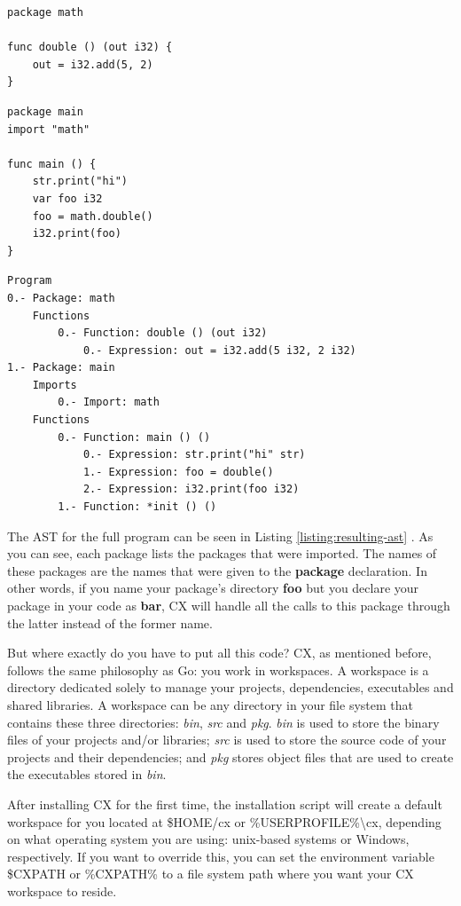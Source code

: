 \documentclass[11pt,fleqn,openany]{book} %
\begin{document}
\begin{lstlisting}[caption={Package to be Imported},captionpos=b,label={listing:import-example}]
package math

func double () (out i32) {
	out = i32.add(5, 2)
}
\end{lstlisting}

\begin{lstlisting}[caption={Main Package},captionpos=b,label={listing:main-package-example}]
package main
import "math"

func main () {
	str.print("hi")
	var foo i32
	foo = math.double()
	i32.print(foo)
}
\end{lstlisting}

\begin{lstlisting}[caption={Resulting Abstract Syntax Tree},captionpos=b,label={listing:resulting-ast}]
Program
0.- Package: math
	Functions
		0.- Function: double () (out i32)
			0.- Expression: out = i32.add(5 i32, 2 i32)
1.- Package: main
	Imports
		0.- Import: math
	Functions
		0.- Function: main () ()
			0.- Expression: str.print("hi" str)
			1.- Expression: foo = double()
			2.- Expression: i32.print(foo i32)
		1.- Function: *init () ()
\end{lstlisting}

The AST for the full program can be seen in Listing \ref{listing:resulting-ast} . As you can see, each package lists the packages that were imported. The names of these packages are the names that were given to the \textbf{package} declaration. In other words, if you name your package's directory \textbf{foo} but you declare your package in your code as \textbf{bar}, CX will handle all the calls to this package through the latter instead of the former name.

But where exactly do you have to put all this code? CX, as mentioned before, follows the same philosophy as Go: you work in workspaces. A workspace is a directory dedicated solely to manage your projects, dependencies, executables and shared libraries. A workspace can be any directory in your file system that contains these three directories: \emph{bin}, \emph{src} and \emph{pkg}. \emph{bin} is used to store the binary files of your projects and/or libraries; \emph{src} is used to store the source code of your projects and their dependencies; and \emph{pkg} stores object files that are used to create the executables stored in \emph{bin}.

After installing CX for the first time, the installation script will create a default workspace for you located at \$HOME/cx or \%USERPROFILE\%\textbackslash cx, depending on what operating system you are using: unix-based systems or Windows, respectively. If you want to override this, you can set the environment variable \$CXPATH or \%CXPATH\% to a file system path where you want your CX workspace to reside.
\end{document}
